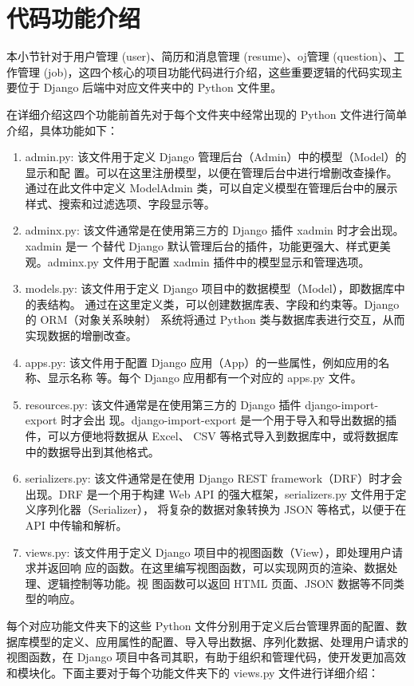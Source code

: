 \documentclass[UTF8,a4paper,10pt]{ctexart}
\begin{document}
\section{代码功能介绍}
本小节针对于用户管理 (user)、简历和消息管理 (resume)、oj管理 (question)、工作管理 (job)，这四个核心的项目功能代码进行介绍，这些重要逻辑的代码实现主要位于 Django 后端中对应文件夹中的 Python 文件里。\\\par
在详细介绍这四个功能前首先对于每个文件夹中经常出现的 Python 文件进行简单介绍，具体功能如下：\\
\begin{enumerate}
    \item admin.py: 该文件用于定义 Django 管理后台（Admin）中的模型（Model）的显示和配 置。可以在这里注册模型，以便在管理后台中进行增删改查操作。通过在此文件中定义 ModelAdmin 类，可以自定义模型在管理后台中的展示样式、搜索和过滤选项、字段显示等。\\
    \item adminx.py: 该文件通常是在使用第三方的 Django 插件 xadmin 时才会出现。xadmin 是一 个替代 Django 默认管理后台的插件，功能更强大、样式更美观。adminx.py 文件用于配置 xadmin 插件中的模型显示和管理选项。\\    
    \item models.py: 该文件用于定义 Django 项目中的数据模型（Model），即数据库中的表结构。 通过在这里定义类，可以创建数据库表、字段和约束等。Django 的 ORM（对象关系映射） 系统将通过 Python 类与数据库表进行交互，从而实现数据的增删改查。\\ 
    \item apps.py: 该文件用于配置 Django 应用（App）的一些属性，例如应用的名称、显示名称 等。每个 Django 应用都有一个对应的 apps.py 文件。\\ 
    \item resources.py: 该文件通常是在使用第三方的 Django 插件 django-import-export 时才会出 现。django-import-export 是一个用于导入和导出数据的插件，可以方便地将数据从 Excel、 CSV 等格式导入到数据库中，或将数据库中的数据导出到其他格式。 \\
    \item serializers.py: 该文件通常是在使用 Django REST framework（DRF）时才会出现。DRF 是一个用于构建 Web API 的强大框架，serializers.py 文件用于定义序列化器（Serializer）， 将复杂的数据对象转换为 JSON 等格式，以便于在 API 中传输和解析。\\
    \item views.py: 该文件用于定义 Django 项目中的视图函数（View），即处理用户请求并返回响 应的函数。在这里编写视图函数，可以实现网页的渲染、数据处理、逻辑控制等功能。视 图函数可以返回 HTML 页面、JSON 数据等不同类型的响应。\\
\end{enumerate}\par
每个对应功能文件夹下的这些 Python 文件分别用于定义后台管理界面的配置、数据库模型的定义、应用属性的配置、导入导出数据、序列化数据、处理用户请求的视图函数，在 Django 项目中各司其职，有助于组织和管理代码，使开发更加高效和模块化。下面主要对于每个功能文件夹下的 views.py 文件进行详细介绍： 
\end{document}

